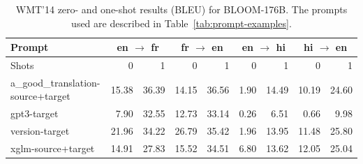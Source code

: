 \begin{table}[ht!]
\centering\small
\addtolength{\tabcolsep}{-2.5pt}
\begin{tabular}{lrr|rr|rr|rr}
\toprule
Prompt & \multicolumn{2}{c}{en $\rightarrow$ fr} & \multicolumn{2}{c}{fr $\rightarrow$ en } & \multicolumn{2}{c}{en $\rightarrow$ hi} & \multicolumn{2}{c}{hi $\rightarrow$ en} \\
\midrule
Shots  & 0 & 1 & 0 & 1 & 0 & 1 & 0 & 1 \\
\midrule
a\_good\_translation-source+target & 15.38 & 36.39 & 14.15 & 36.56 & 1.90 & 14.49 & 10.19 & 24.60  \\
gpt3-target     & 7.90 & 32.55 & 12.73 & 33.14 & 0.26 & 6.51 & 0.66 & 9.98 \\
version-target  & 21.96 & 34.22 & 26.79 & 35.42 & 1.96 & 13.95 & 11.48 & 25.80 \\
xglm-source+target     & 14.91 & 27.83 & 15.52 & 34.51 & 6.80 & 13.62 & 12.05 & 25.04 \\
\bottomrule
\end{tabular}%
\caption{WMT'14 zero- and one-shot results (BLEU) for BLOOM-176B. The prompts used are described in Table~\ref{tab:prompt-examples}.}%
\label{tab:WMT-14enfr-byprompts-0shot}
\end{table}